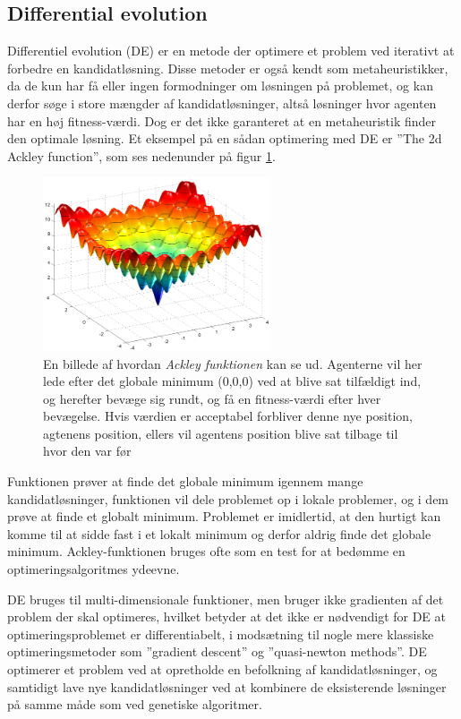 \subsection{Differential evolution}
Differentiel evolution (DE) er en metode der optimere et problem ved iterativt at forbedre en kandidatløsning. Disse metoder er også kendt som metaheuristikker, da de kun har få eller ingen formodninger om løsningen på problemet, og kan derfor søge i store mængder af kandidatløsninger, altså løsninger hvor agenten har en høj fitness-værdi. Dog er det ikke garanteret at en metaheuristik finder den optimale løsning. Et eksempel på en sådan optimering med DE er ”The 2d Ackley function”, som ses nedenunder på figur \ref{Ackley}.
\begin{figure}[H]
    \centering
    \includegraphics[width=0.6\textwidth]{figures/Ackley.png}
    \caption{En billede af hvordan \textit{Ackley funktionen} kan se ud. Agenterne vil her lede efter det globale minimum (0,0,0) ved at blive sat tilfældigt ind, og herefter bevæge sig rundt, og få en fitness-værdi efter hver bevægelse. Hvis værdien er acceptabel forbliver denne nye position, agtenens position, ellers vil agentens position blive sat tilbage til hvor den var før}
    \label{Ackley}
\end{figure}
Funktionen prøver at finde det globale minimum igennem mange kandidatløsninger, funktionen vil dele problemet op i lokale problemer, og i dem prøve at finde et globalt minimum. Problemet er imidlertid, at den hurtigt kan komme til at sidde fast i et lokalt minimum og derfor aldrig finde det globale minimum. Ackley-funktionen bruges ofte som en test for at bedømme en optimeringsalgoritmes ydeevne. 
\par
DE bruges til multi-dimensionale funktioner, men bruger ikke gradienten af det problem der skal optimeres, hvilket betyder at det ikke er nødvendigt for DE at optimeringsproblemet er differentiabelt, i modsætning til nogle mere klassiske optimeringsmetoder som ”gradient descent” og ”quasi-newton methods”. DE optimerer et problem ved at opretholde en befolkning af kandidatløsninger, og samtidigt lave nye kandidatløsninger ved at kombinere de eksisterende løsninger på samme måde som ved genetiske algoritmer. 

